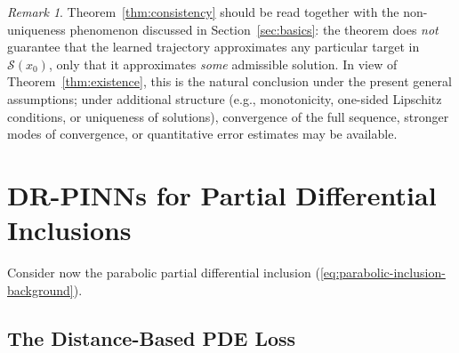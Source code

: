 \documentclass[11pt]{elsarticle}
\theoremstyle{definition}
\theoremstyle{remark}
\newtheorem{remark}[theorem]{Remark}
\numberwithin{equation}{section}
\begin{document}
	\begin{remark}
		Theorem~\ref{thm:consistency} should be read together with the
		non-uniqueness phenomenon discussed in Section~\ref{sec:basics}: the
		theorem does \emph{not} guarantee that the learned trajectory
		approximates any particular target in $\mathcal{S}(x_0)$, only that it
		approximates \emph{some} admissible solution. In view of
		Theorem~\ref{thm:existence}, this is the natural conclusion under the
		present general assumptions; under additional structure (e.g.,
		monotonicity, one-sided Lipschitz conditions, or uniqueness of
		solutions), convergence of the full sequence, stronger modes of
		convergence, or quantitative error estimates may be available.
	\end{remark}
	
	
	\section{DR-PINNs for Partial Differential Inclusions}
	\label{sec:pde}
	
	Consider now the parabolic partial differential
	inclusion (\ref{eq:parabolic-inclusion-background}).
	
	\subsection{The Distance-Based PDE Loss}
	\label{sec:pde-loss}
	
\end{document}
